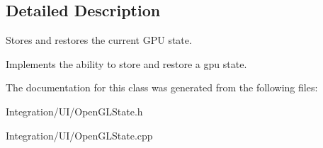 \subsection{Detailed Description}
Stores and restores the current G\-P\-U state. 

Implements the ability to store and restore a gpu state. 

The documentation for this class was generated from the following files\-:\begin{DoxyCompactItemize}
\item 
Integration/\-U\-I/Open\-G\-L\-State.\-h\item 
Integration/\-U\-I/Open\-G\-L\-State.\-cpp\end{DoxyCompactItemize}
